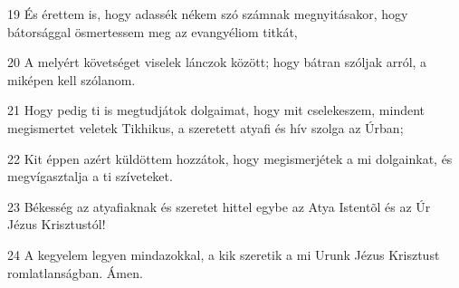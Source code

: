\par 19 És érettem is, hogy adassék nékem szó számnak megnyitásakor, hogy bátorsággal ösmertessem meg az evangyéliom titkát,
\par 20 A melyért követséget viselek lánczok között; hogy bátran szóljak arról, a miképen kell szólanom.
\par 21 Hogy pedig ti is megtudjátok dolgaimat, hogy mit cselekeszem, mindent megismertet veletek Tikhikus, a szeretett atyafi és hív szolga az Úrban;
\par 22 Kit éppen azért küldöttem hozzátok, hogy megismerjétek a mi dolgainkat, és megvígasztalja a ti szíveteket.
\par 23 Békesség az atyafiaknak és szeretet hittel egybe az Atya Istentõl és az Úr Jézus Krisztustól!
\par 24 A kegyelem legyen mindazokkal, a kik szeretik a mi Urunk Jézus Krisztust romlatlanságban. Ámen.


